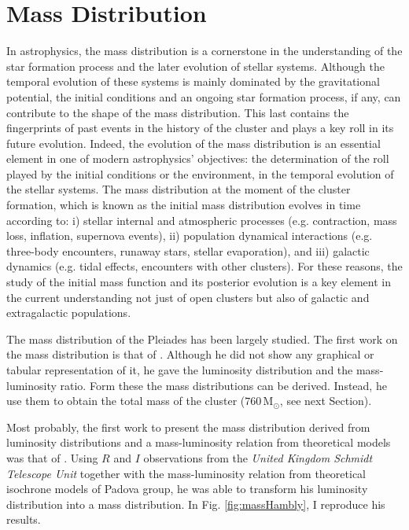 \section{Mass Distribution}
\label{sect:mass}

In astrophysics, the mass distribution is a cornerstone in the understanding of the star formation process and the later evolution of stellar systems. Although the temporal evolution of these systems is mainly dominated by the gravitational potential, the initial conditions and an ongoing star formation process, if any, can contribute to the shape of the mass distribution. This last contains the fingerprints of past events in the history of the cluster and plays a key roll in its future evolution. Indeed, the evolution of the mass distribution is an essential element in one of modern astrophysics' objectives: the determination of the roll played by the initial conditions or the environment, in the temporal evolution of the stellar systems. The mass distribution at the moment of the cluster formation, which is known as the initial mass distribution evolves in time according to: i) stellar internal and atmospheric processes (e.g. contraction, mass loss, inflation, supernova events), ii) population dynamical interactions (e.g. three-body encounters, runaway stars, stellar evaporation), and iii) galactic dynamics (e.g. tidal effects, encounters with other clusters). For these reasons, the study of the initial mass function and its posterior evolution is a key element in the current understanding not just of open clusters but also of galactic and extragalactic populations.  


The mass distribution of the Pleiades has been largely studied. The first work on the mass distribution is that of \citet{Limber1962}. Although he did not show any graphical or tabular representation of it, he gave the luminosity distribution and the mass-luminosity ratio. Form these the mass distributions can be derived. Instead, he use them to obtain the total mass of the cluster ($760\,\mathrm{M_{\odot}}$, see next Section). 

Most probably, the first work to present the mass distribution derived from luminosity distributions and a mass-luminosity relation from theoretical models was that of \citet{Hambly1991}. Using $R$ and $I$ observations from the \emph{United Kingdom Schmidt Telescope Unit} together with the mass-luminosity relation from theoretical isochrone models of Padova group, he was able to transform his luminosity distribution into a mass distribution. In Fig. \ref{fig:massHambly}, I reproduce his results. 

